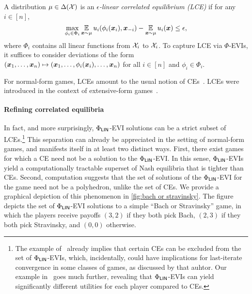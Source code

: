 \begin{example}[LCE]
    \label{example:CE}
    A distribution $\mu \in \Delta({\mathcal{X}})$ is an \emph{$\epsilon$-linear correlated equilibrium (LCE)} if for any $i \in [n]$,
    \begin{equation*}
        \max_{\phi_i \in \Phi_i} \operatorname*{\mathbb E}_{ {\bm{x}} \sim \mu } u_i(\phi_i({\bm{x}}_i), {\bm{x}}_{-i}) - \operatorname*{\mathbb E}_{{\bm{x}} \sim \mu} u_i({\bm{x}}) \leq \epsilon,
    \end{equation*}
    where $\Phi_i$ contains all linear functions from ${\mathcal{X}}_i$ to ${\mathcal{X}}_i$. To capture LCE via $\Phi$-EVIs, it suffices to consider deviations of the form $({\bm{x}}_1, \dots, {\bm{x}}_n) \mapsto ({\bm{x}}_1, \dots, \phi_i({\bm{x}}_i), \dots, {\bm{x}}_n)$ for all $i \in [n]$ and $\phi_i \in \Phi_i$.
\end{example}

For normal-form games, LCEs amount to the usual notion of CEs~\citep{Aumann74:Subjectivity}. LCEs were introduced in the context of extensive-form games~\citep{Farina23:Polynomial,Farina24:Polynomial}.

\paragraph{Refining correlated equilibria} In fact, and more surprisingly, $\Phi_\mathsf{LIN}$-EVI solutions can be a strict subset of LCEs.\footnote{The example of~\citet[Example 1]{Ahunbay25:First} already implies that certain CEs can be excluded from the set of $\Phi_\mathsf{LIN}$-EVIs, which, incidentally, could have implications for last-iterate convergence in some classes of games, as discussed by that auhtor. Our example in~ goes much further, revealing that $\Phi_\mathsf{LIN}$-EVIs can yield significantly different utilities for each player compared to CEs.} This separation can already be appreciated in the setting of normal-form games, and manifests itself in at least two distinct ways. First, there exist games for which a CE need not be a solution to the $\Phi_\mathsf{LIN}$-EVI. In this sense, $\Phi_\mathsf{LIN}$-EVIs yield a computationally tractable superset of Nash equilibria that is tighter than CEs. Second, computation suggests that the set of solutions of the $\Phi_\mathsf{LIN}$-EVI for the game need not be a polyhedron, unlike the set of CEs. We provide a graphical depiction of this phenomenon in \cref{fig:bach or stravinsky}. The figure depicts the set of $\Phi_\mathsf{LIN}$-EVI solutions to a simple ``Bach or Stravinsky'' game, in which the players receive payoffs $(3,2)$ if they both pick Bach, $(2,3)$ if they both pick Stravinsky, and $(0,0)$ otherwise.

